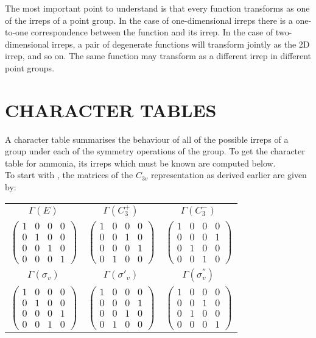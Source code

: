 \documentclass[a4paper, 12pt, openany]{report}
\begin{document}
The most important point to understand is that every function \break transforms as one of the irreps of a point group.
In the case of one-dimensional irreps there is a one-to-one correspondence between the function and its \break irrep. In
the case of two-dimensional irreps, a pair of degenerate functions will transform jointly as the 2D irrep, and so
on. The same function may transform as a different irrep in different point groups. 

\section{CHARACTER TABLES}
	A character table summarises the behaviour of all of the possible irreps of a group under each of the symmetry
	operations of the group. To get the character table for ammonia, its irreps which must be known
are computed below.\\
To start with , the matrices of the $C_{3v}$ representation as derived earlier are given by:
\begin{table}[H]
\begin{tabular}{ccc}$\Gamma(E)$ & $\Gamma(C_3^+)$ & $\Gamma(C_3^-)$ \\
$\begin{pmatrix}
1&0&0&0\\0&1&0&0\\0&0&1&0\\0&0&0&1\end{pmatrix}$&$\begin{pmatrix}
1&0&0&0\\0&0&1&0\\0&0&0&1\\0&1&0&0\end{pmatrix}$&$\begin{pmatrix}
1&0&0&0\\0&0&0&1\\0&1&0&0\\0&0&1&0\end{pmatrix} $\\\linebreak[5cm]$ \Gamma(\sigma_v)$&$ \Gamma(\sigma'_v)$&$ \Gamma(\sigma_v^{''})$\\
$ \begin{pmatrix}
1&0&0&0\\0&1&0&0\\0&0&0&1\\0&0&1&0\end{pmatrix}
$&$\begin{pmatrix}
1&0&0&0\\0&0&0&1\\0&0&1&0\\0&1&0&0\end{pmatrix}
$&$ \begin{pmatrix}
1&0&0&0\\0&0&1&0\\0&1&0&0\\0&0&0&1\end{pmatrix}$\end{tabular}\end{table}
\end{document}
